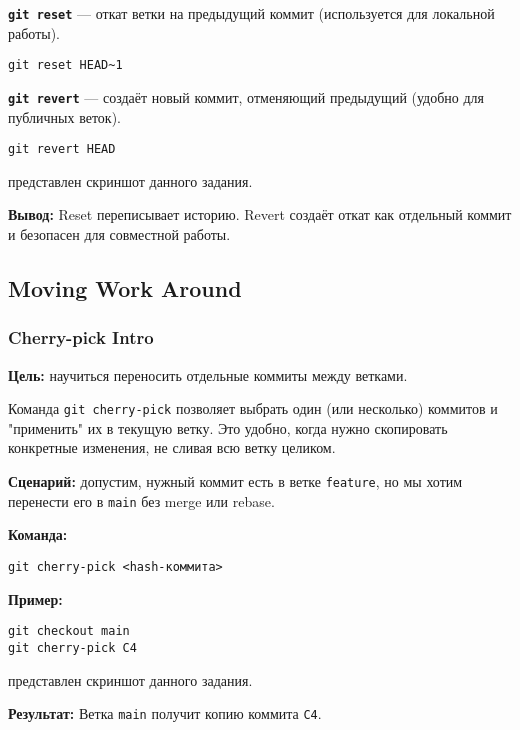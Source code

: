 \documentclass[a4paper,12pt]{report}
\begin{document}
\textbf{\texttt{git reset}} — откат ветки на предыдущий коммит (используется для локальной работы).

\begin{verbatim}
git reset HEAD~1
\end{verbatim}

\textbf{\texttt{git revert}} — создаёт новый коммит, отменяющий предыдущий (удобно для публичных веток).

\begin{verbatim}
git revert HEAD
\end{verbatim}

 представлен скриншот данного задания.

\textbf{Вывод:} Reset переписывает историю. Revert создаёт откат как отдельный коммит и безопасен для совместной работы.

\subsection{Moving Work Around}

\subsubsection{Cherry-pick Intro}
\textbf{Цель:} научиться переносить отдельные коммиты между ветками.

Команда \texttt{git cherry-pick} позволяет выбрать один (или несколько) коммитов и "применить" их в текущую ветку. Это удобно, когда нужно скопировать конкретные изменения, не сливая всю ветку целиком.

\textbf{Сценарий:} допустим, нужный коммит есть в ветке \texttt{feature}, но мы хотим перенести его в \texttt{main} без merge или rebase.

\textbf{Команда:}
\begin{verbatim}
git cherry-pick <hash-коммита>
\end{verbatim}

\textbf{Пример:}
\begin{verbatim}
git checkout main
git cherry-pick C4
\end{verbatim}

 представлен скриншот данного задания.

\textbf{Результат:} Ветка \texttt{main} получит копию коммита \texttt{C4}.
\end{document}
